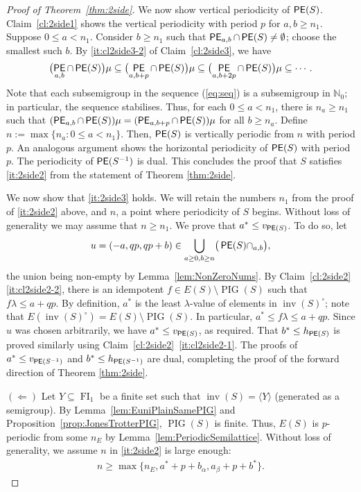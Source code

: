 \documentclass[reqno]{amsart}
\theoremstyle{plain}
\theoremstyle{definition}
\DeclareMathOperator{\inv}{inv}
\DeclareMathOperator{\PIG}{PIG}
\DeclareMathOperator{\FI}{FI}
\let\P\relax
\DeclareMathOperator{\P}{\textup{\textsf{P}}}
\DeclareMathOperator{\PE}{\textup{\textsf{PE}}}
\numberwithin{equation}{section}
\begin{document}
\begin{proof}[Proof of Theorem~\ref{thm:2side}]
We now show vertical periodicity of $\PE(S)$. Claim~\ref{cl:2side1} shows the vertical periodicity with period $p$ for $a,b\geq n_1$. Suppose $0\leq a <n_1$. Consider $b\geq n_1$ such that $\PE_{a,b}\cap \PE(S)\neq\emptyset$; choose the smallest such $b$. By \ref{it:cl2side3-2} of Claim~\ref{cl:2side3}, we have 
\begin{align}
\bigl(\PE_{a,b}\cap \PE(S)\bigr)\mu \subseteq \bigl(\PE_{a,b+p}\cap \PE(S)\bigr)\mu \subseteq \bigl(\PE_{a,b+2p}\cap \PE(S)\bigr)\mu\subseteq\cdots .\label{eq:seq}    
\end{align}
Note that each subsemigroup in the sequence (\ref{eq:seq}) is a subsemigroup in $\mathbb{N}_0$; in particular, the sequence stabilises. Thus, for each $0\leq a<n_1$, 
there is $n_a\geq n_1$ such that 
$(\PE_{a, b}\cap \PE(S))\mu = (\PE_{a, b+p} \cap \PE(S))\mu$ for all $b\geq n_a$.
Define $n := \max\{n_a: 0\leq a <n_1\}$. Then, $\PE(S)$ is vertically periodic from $n$ with period $p$. An analogous argument shows the horizontal periodicity of $\PE(S)$ with period $p$. The periodicity of $\PE(S^{-1})$ is dual. This concludes the proof that $S$ satisfies \ref{it:2side2} from the statement of Theorem \ref{thm:2side}.

We now show that \ref{it:2side3} holds. 
We will retain the numbers $n_1$ from the proof of \ref{it:2side2} above, and $n$, a point where periodicity of $S$ begins. Without loss of generality we may assume that $n\geq n_1$.
We prove that $a^\ast \leq v_{\PE(S)}$. To do so, let 
\begin{align*}
    u = (-a, qp, qp+b) \in \bigcup_{a\geq 0, b\geq n}\bigr(\PE(S)\cap \P_{a,b}\bigr),
\end{align*}
the union being non-empty by Lemma~\ref{lem:NonZeroNums}.
By Claim~\ref{cl:2side2} \ref{it:cl2side2-2}, there is an idempotent $f\in E(S)\setminus\PIG(S)$ such that $f\lambda\leq a+qp$. By definition, $a^\ast$ is the least $\lambda$-value of elements in $\inv(S)^\circ$; note that $E(\inv(S)^\circ) = E(S)\setminus\PIG(S)$. In particular, $a^\ast \leq f\lambda \leq a+qp$. Since $u$ was chosen arbitrarily, we have $a^\ast \leq v_{\PE(S)}$, as required. 
That $b^\ast \leq h_{\PE(S)}$ is proved similarly using Claim~\ref{cl:2side2}~\ref{it:cl2side2-1}.
The proofs of $a^\ast \leq v_{\PE(S^{-1})}$ and $b^\ast \leq h_{\PE(S^{-1})}$ are dual,
completing the proof of the forward direction of Theorem  \ref{thm:2side}.

\noindent $(\Leftarrow)$ Let $Y\subseteq\FI_1$ be a finite set such that $\inv(S) = \langle Y\rangle$ (generated as a semigroup). By Lemma~\ref{lem:EuniPlainSamePIG} and Proposition~\ref{prop:JonesTrotterPIG}, $\PIG(S)$ is finite. Thus, $E(S)$ is $p$-periodic from some $n_E$ by Lemma~\ref{lem:PeriodicSemilattice}. Without loss of generality, we assume $n$ in \ref{it:2side2} is large enough: 
\begin{align*}
    n \geq \max\{n_E, a^\ast + p +b_{\alpha}, a_{\beta}+p+b^\ast\}.
\end{align*}


\end{proof}
\end{document}
